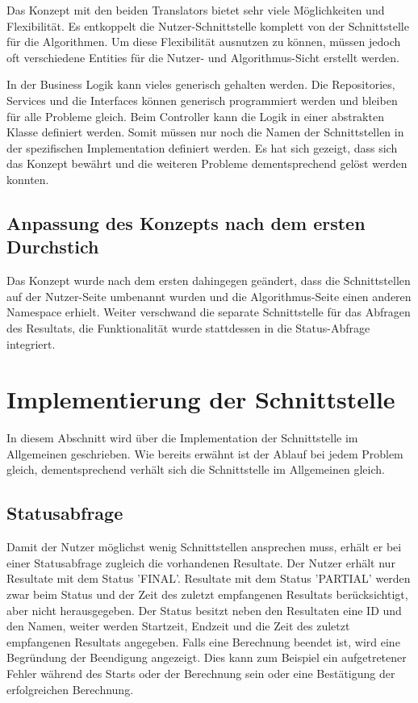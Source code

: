 Das Konzept mit den beiden Translators bietet sehr viele Möglichkeiten und Flexibilität. Es entkoppelt die Nutzer-Schnittstelle komplett von der Schnittstelle für die Algorithmen. Um diese 
Flexibilität ausnutzen zu können, müssen jedoch oft verschiedene Entities für die Nutzer- und Algorithmus-Sicht erstellt werden.

In der Business Logik kann vieles generisch gehalten werden. Die Repositories, Services und die Interfaces können generisch programmiert werden und bleiben für alle Probleme gleich. Beim 
Controller kann die Logik in einer abstrakten Klasse definiert werden. Somit müssen nur noch die Namen der Schnittstellen in der spezifischen Implementation definiert werden. Es hat sich 
gezeigt, dass sich das Konzept bewährt und die weiteren Probleme dementsprechend gelöst werden konnten.

\subsection{Anpassung des Konzepts nach dem ersten Durchstich}\label{doings_prototyp}
Das Konzept wurde nach dem ersten  dahingegen geändert, dass die Schnittstellen auf der Nutzer-Seite umbenannt wurden und die 
Algorithmus-Seite einen anderen Namespace erhielt. Weiter verschwand die separate Schnittstelle für das Abfragen des Resultats, die Funktionalität wurde stattdessen in die Status-Abfrage 
integriert.

\section{Implementierung der Schnittstelle}\label{impl_interface}
In diesem Abschnitt wird über die Implementation der Schnittstelle im Allgemeinen geschrieben. Wie bereits erwähnt ist der Ablauf bei jedem Problem gleich, dementsprechend verhält sich die 
Schnittstelle im Allgemeinen gleich.

\subsection{Statusabfrage}
Damit der Nutzer möglichst wenig Schnittstellen ansprechen muss, erhält er bei einer Statusabfrage zugleich die vorhandenen Resultate. Der Nutzer erhält nur Resultate mit dem Status 'FINAL'. 
Resultate mit dem Status 'PARTIAL' werden zwar beim Status und der Zeit des zuletzt empfangenen Resultats berücksichtigt, aber nicht herausgegeben. Der Status besitzt neben den 
Resultaten eine ID und den Namen, weiter werden Startzeit, Endzeit und die Zeit des zuletzt empfangenen Resultats angegeben. Falls eine Berechnung beendet ist, wird eine 
Begründung der Beendigung angezeigt. Dies kann zum Beispiel ein aufgetretener Fehler während des Starts oder der Berechnung sein oder eine Bestätigung der erfolgreichen Berechnung.

